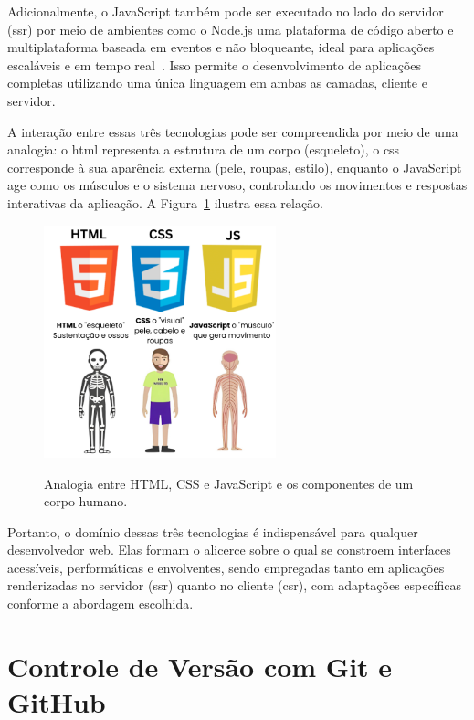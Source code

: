 Adicionalmente, o JavaScript também pode ser executado no lado do servidor (\acrshort{ssr}) por meio de ambientes como o Node.js uma plataforma de código aberto e multiplataforma baseada em eventos e não bloqueante, ideal para aplicações escaláveis e em tempo real~\cite{nodejs2025, js2025}. Isso permite o desenvolvimento de aplicações completas utilizando uma única linguagem em ambas as camadas, cliente e servidor.

A interação entre essas três tecnologias pode ser compreendida por meio de uma analogia: o \acrshort{html} representa a estrutura de um corpo (esqueleto), o \acrshort{css} corresponde à sua aparência externa (pele, roupas, estilo), enquanto o JavaScript age como os músculos e o sistema nervoso, controlando os movimentos e respostas interativas da aplicação. A Figura~\ref{fig:html-css-js} ilustra essa relação.

\begin{figure}[H]
  \centering
  \caption{Analogia entre HTML, CSS e JavaScript e os componentes de um corpo humano.}
  \includegraphics[width=0.6\textwidth]{media/html_css_js_analogia.png}
  \label{fig:html-css-js}
\end{figure}

Portanto, o domínio dessas três tecnologias é indispensável para qualquer desenvolvedor web. Elas formam o alicerce sobre o qual se constroem interfaces acessíveis, performáticas e envolventes, sendo empregadas tanto em aplicações renderizadas no servidor (\acrshort{ssr}) quanto no cliente (\acrshort{csr}), com adaptações específicas conforme a abordagem escolhida.


\section{Controle de Versão com Git e GitHub}
\label{sec:git-github}

